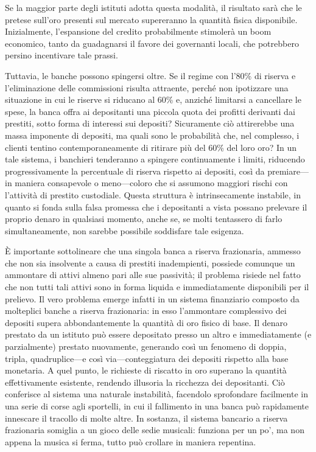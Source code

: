 \documentclass[
  a5paper,
  smalldemyvopaper,10pt,twoside,onecolumn,openright,extrafontsizes,hidelinks]{memoir}
\begin{document}
Se la maggior parte degli istituti adotta questa modalità, il risultato
sarà che le pretese sull'oro presenti sul mercato supereranno la
quantità fisica disponibile. Inizialmente, l'espansione del credito
probabilmente stimolerà un boom economico, tanto da guadagnarsi il
favore dei governanti locali, che potrebbero persino incentivare tale
prassi.

Tuttavia, le banche possono spingersi oltre. Se il regime con l'80\% di
riserva e l'eliminazione delle commissioni risulta attraente, perché non
ipotizzare una situazione in cui le riserve si riducano al 60\% e,
anziché limitarsi a cancellare le spese, la banca offra ai depositanti
una piccola quota dei profitti derivanti dai prestiti, sotto forma di
interessi sui depositi? Sicuramente ciò attirerebbe una massa imponente
di depositi, ma quali sono le probabilità che, nel complesso, i clienti
tentino contemporaneamente di ritirare più del 60\% del loro oro? In un
tale sistema, i banchieri tenderanno a spingere continuamente i limiti,
riducendo progressivamente la percentuale di riserva rispetto ai
depositi, così da premiare---in maniera consapevole o meno---coloro che
si assumono maggiori rischi con l'attività di prestito custodiale.
Questa struttura è intrinsecamente instabile, in quanto si fonda sulla
falsa promessa che i depositanti a vista possano prelevare il proprio
denaro in qualsiasi momento, anche se, se molti tentassero di farlo
simultaneamente, non sarebbe possibile soddisfare tale esigenza.

È importante sottolineare che una singola banca a riserva frazionaria,
ammesso che non sia insolvente a causa di prestiti inadempienti,
possiede comunque un ammontare di attivi almeno pari alle sue passività;
il problema risiede nel fatto che non tutti tali attivi sono in forma
liquida e immediatamente disponibili per il prelievo. Il vero problema
emerge infatti in un sistema finanziario composto da molteplici banche a
riserva frazionaria: in esso l'ammontare complessivo dei depositi supera
abbondantemente la quantità di oro fisico di base. Il denaro prestato da
un istituto può essere depositato presso un altro e immediatamente (e
parzialmente) prestato nuovamente, generando così un fenomeno di doppia,
tripla, quadruplice---e così via---conteggiatura dei depositi rispetto
alla base monetaria. A quel punto, le richieste di riscatto in oro
superano la quantità effettivamente esistente, rendendo illusoria la
ricchezza dei depositanti. Ciò conferisce al sistema una naturale
instabilità, facendolo sprofondare facilmente in una serie di corse agli
sportelli, in cui il fallimento in una banca può rapidamente innescare
il tracollo di molte altre. In sostanza, il sistema bancario a riserva
frazionaria somiglia a un gioco delle sedie musicali: funziona per un
po', ma non appena la musica si ferma, tutto può crollare in maniera
repentina.
\end{document}
